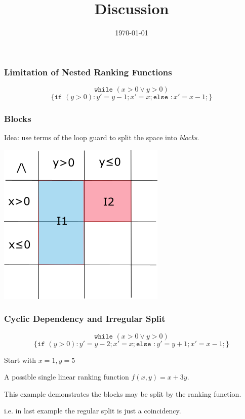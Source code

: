 \documentclass[11pt]{beamer}
\title{Discussion}
\date{\today}
\begin{document}
\maketitle
\begin{frame}\frametitle{Limitation of Nested Ranking Functions}

\begin{example}

\[\texttt{while }(x > 0 \vee y > 0) \]
\[\{\texttt{if }(y > 0): y' = y - 1; x ' = x;\texttt{else }: x' = x - 1;\}\]
\end{example}

\end{frame}


\begin{frame}\frametitle{Blocks}
Idea: use terms of the loop guard to split the space into \textit{blocks}.
\begin{center}

\includegraphics[scale = 0.65]{block.png}

\end{center}
\end{frame}
\begin{frame}\frametitle{Cyclic Dependency and Irregular Split}

\begin{example}

\[\texttt{while }(x > 0 \vee y > 0) \]
\[\{\texttt{if }(y > 0): y' = y - 2; x ' = x;\texttt{else }: y' = y + 1;x' = x - 1;\}\]

Start with $x = 1, y = 5$


A possible single linear ranking function $f(x, y) = x + 3y$.

This example demonstrates the blocks may be split by the ranking function. 

i.e. in last example the regular split is just a coincidency.

\end{example}

\end{frame}
\end{document}
